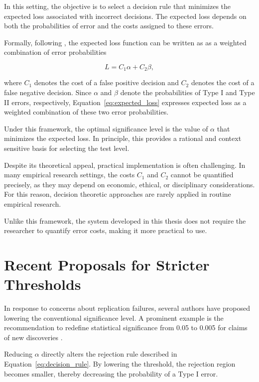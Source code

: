 In this setting, the objective is to select a decision rule that minimizes the 
expected loss associated with incorrect decisions. The expected loss depends on 
both the probabilities of error and the costs assigned to these errors.

Formally, following \cite{Berger1985}, the expected loss function can be written as as a weighted combination of error probabilities

\begin{equation}
	L = C_1 \alpha + C_2 \beta,
	\label{eq:expected_loss}
\end{equation}

where $C_1$ denotes the cost of a false positive decision and $C_2$ denotes the 
cost of a false negative decision. Since $\alpha$ and $\beta$ denote the probabilities of 
Type I and Type II errors, respectively, Equation~\ref{eq:expected_loss} expresses expected loss 
as a weighted combination of these two error probabilities.


Under this framework, the optimal significance level is the value of $\alpha$ 
that minimizes the expected loss. In principle, this provides a rational and 
context sensitive basis for selecting the test level.

Despite its theoretical appeal, practical implementation is often challenging. 
In many empirical research settings, the costs $C_1$ and $C_2$ cannot be quantified 
precisely, as they may depend on economic, ethical, or disciplinary considerations. 
For this reason, decision theoretic approaches are rarely applied in routine 
empirical research.

Unlike this framework, the system developed in this thesis does not require the researcher to quantify error costs, making it more practical to use.


\section{Recent Proposals for Stricter Thresholds}

In response to concerns about replication failures, several authors have proposed lowering the conventional significance level. A prominent example is the recommendation to redefine statistical significance from 0.05 to 0.005 for claims of new discoveries \cite{Benjamin2018}.

Reducing $\alpha$ directly alters the rejection rule described in Equation~\ref{eq:decision_rule}. By lowering the threshold, the rejection region becomes smaller, thereby decreasing the probability of a Type I error.

